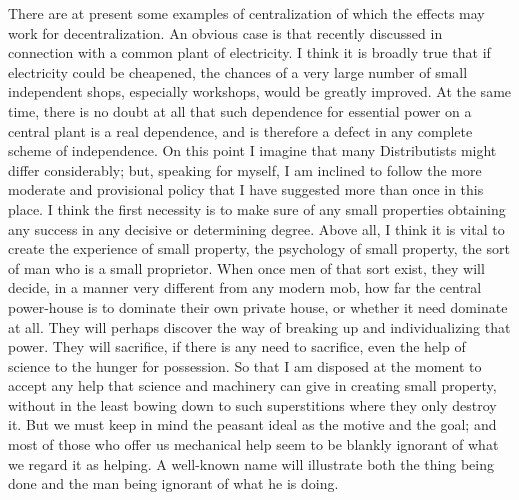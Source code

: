\documentclass{book}
\begin{document}
There are at present some examples of centralization of which the effects may work for decentralization. An obvious case is that recently discussed in connection with a common plant of electricity. I think it is broadly true that if electricity could be cheapened, the chances of a very large number of small independent shops, especially workshops, would be greatly improved. At the same time, there is no doubt at all that such dependence for essential power on a central plant is a real dependence, and is therefore a defect in any complete scheme of independence. On this point I imagine that many Distributists might differ considerably; but, speaking for myself, I am inclined to follow the more moderate and provisional policy that I have suggested more than once in this place. I think the first necessity is to make sure of any small properties obtaining any success in any decisive or determining degree. Above all, I think it is vital to create the experience of small property, the psychology of small property, the sort of man who is a small proprietor. When once men of that sort exist, they will decide, in a manner very different from any modern mob, how far the central power-house is to dominate their own private house, or whether it need dominate at all. They will perhaps discover the way of breaking up and individualizing that power. They will sacrifice, if there is any need to sacrifice, even the help of science to the hunger for possession. So that I am disposed at the moment to accept any help that science and machinery can give in creating small property, without in the least bowing down to such superstitions where they only destroy it. But we must keep in mind the peasant ideal as the motive and the goal; and most of those who offer us mechanical help seem to be blankly ignorant of what we regard it as helping. A well-known name will illustrate both the thing being done and the man being ignorant of what he is doing.
\end{document}
